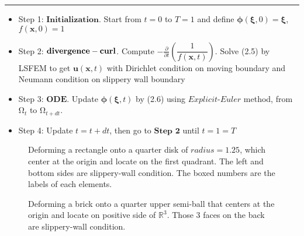 \documentclass{article}
\theoremstyle{definition}
\theoremstyle{remark}
\numberwithin{equation}{section}
\numberwithin{subsection}{section}
\begin{document}
\begin{algorithm}[H]
	{
	\caption{: $deformation$ $method$ }
	\hrule
	\begin{itemize}
		\item Step 1: $\mathbf{Initialization}$. Start from $t=0$ to $T=1$ and define $\pmb{\phi}(\pmb{\xi},0)= \pmb{\xi}$, $f(\pmb{x},0)=1$
		\item Step 2: $\bf{divergence-curl}$.
		Compute  $-\frac{\partial}{\partial t}(\dfrac{1}{f(\pmb{x},t)})$. 
		Solve (2.5) by LSFEM to get $\pmb{u}(\pmb{x},t)$
		with Dirichlet condition on moving boundary and Neumann condition on slippery wall boundary
		
		\item Step 3:  $\mathbf{ODE}$. Update $\pmb{\phi}(\pmb{\xi},t)$ by (2.6) using $Explicit$-$Euler$ method, from $\mathrm{\Omega}_t$ to $\mathrm{\Omega}_{t+dt}$.
		\item Step 4: Update $t=t+dt$, then go to $\mathbf{Step}$ $\mathbf{2}$ until $t=1=T$
	\end{itemize}
	}
\end{algorithm}


\begin{figure}[H]
	\caption{Deforming a rectangle onto a quarter disk of $radius=1.25$, which center at the origin and locate on the first quadrant. The left and bottom sides are slippery-wall condition. The boxed numbers are the labels of each elements.}
	\begin{center}
	\end{center}
\end{figure}
% 
\begin{figure}[H]
	\caption{Deforming a brick onto a quarter upper semi-ball that centers at the origin and locate on positive side of $\mathbb R^3$. Those 3 faces on the back are slippery-wall condition.}
	\begin{center}
	\end{center}
\end{figure}
\end{document}

